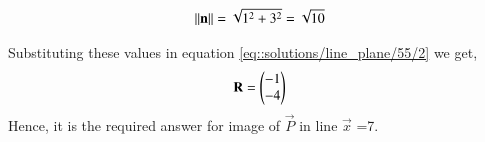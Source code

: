 \begin{align}
     \left\lVert\mathbf{n}\right\rVert = \sqrt{1^2+3^2} = \sqrt{10}
\end{align}
   
 

  
 
 
Substituting these values in equation \eqref{eq::solutions/line_plane/55/2} we get,
\begin{equation}
\mathbf{R} = \begin{pmatrix}-1 \\ -4\end{pmatrix} 
\end{equation}
Hence, it is the required answer for image of $\vec{P}$ in line  $\vec{x}$ =7. 
 
 

 

